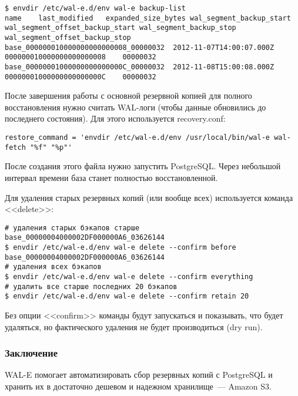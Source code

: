 \begin{lstlisting}[label=lst:wal-e12,caption=Список резервных копий]
$ envdir /etc/wal-e.d/env wal-e backup-list
name	last_modified	expanded_size_bytes	wal_segment_backup_start	wal_segment_offset_backup_start	wal_segment_backup_stop	wal_segment_offset_backup_stop
base_000000010000000000000008_00000032	2012-11-07T14:00:07.000Z		000000010000000000000008	00000032
base_00000001000000000000000C_00000032	2012-11-08T15:00:08.000Z		00000001000000000000000C	00000032
\end{lstlisting}

После завершения работы с основной резервной копией для полного восстановления нужно считать WAL-логи (чтобы данные обновились до последнего состояния). Для этого используется recovery.conf:

\begin{lstlisting}[label=lst:wal-e13,caption=recovery.conf]
restore_command = 'envdir /etc/wal-e.d/env /usr/local/bin/wal-e wal-fetch "%f" "%p"'
\end{lstlisting}

После создания этого файла нужно запустить PostgreSQL. Через небольшой интервал времени база станет полностью восстановленной.

Для удаления старых резервных копий (или вообще всех) используется команда <<delete>>:

\begin{lstlisting}[label=lst:wal-e14,caption=Удаление резервных копий]
# удаления старых бэкапов старше base_00000004000002DF000000A6_03626144
$ envdir /etc/wal-e.d/env wal-e delete --confirm before base_00000004000002DF000000A6_03626144
# удаления всех бэкапов
$ envdir /etc/wal-e.d/env wal-e delete --confirm everything
# удалить все старше последних 20 бэкапов
$ envdir /etc/wal-e.d/env wal-e delete --confirm retain 20
\end{lstlisting}

Без опции <<confirm>> команды будут запускаться и показывать, что будет удаляться, но фактического удаления не будет производиться (dry run).

\subsubsection{Заключение}
WAL-E помогает автоматизировать сбор резервных копий с PostgreSQL и хранить их в достаточно дешевом и надежном хранилище~--- Amazon S3.